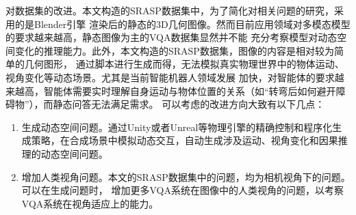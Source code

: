 对数据集的改进。本文构造的SRASP数据集中，为了简化对相关问题的研究，采用的是Blender引擎
渲染后的静态的3D几何图像。然而目前应用领域对多模态模型的要求越来越高，静态图像为主的VQA数据集显然并不能
充分考察模型对动态空间变化的推理能力。此外，本文构造的SRASP数据集，图像的内容是相对较为简单的几何图形，
通过脚本进行生成而得，无法模拟真实物理世界中的物体运动、视角变化等动态场景。尤其是当前智能机器人领域发展
加快，对智能体的要求越来越高，智能体需要实时理解自身运动与物体位置的关系（如“转弯后如何避开障碍物”），而静态问答无法满足需求。
可以考虑的改进方向大致有以下几点：
\begin{enumerate}[itemsep=0pt,parsep=0pt]
    \item 生成动态空间问题。通过Unity或者Unreal等物理引擎的精确控制和程序化生成策略，在合成场景中模拟动态交互，自动生成涉及运动、视角变化和因果推理的动态空间问题。
    \item 增加人类视角问题。本文的SRASP数据集中的问题，均为相机视角下的问题。可以在生成问题时，
增加更多VQA系统在图像中的人类视角的问题，以考察VQA系统在视角适应上的能力。
\end{enumerate}
